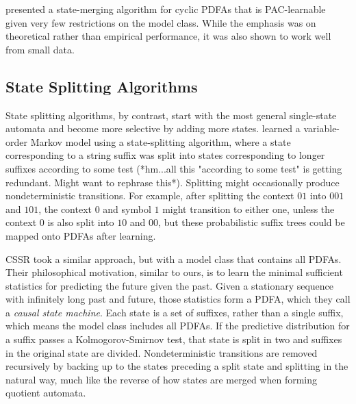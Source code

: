 \cite{Clark2004} presented a state-merging algorithm for cyclic PDFAs that is PAC-learnable given very few restrictions on the model class.  While the emphasis was on theoretical rather than empirical performance, it was also shown to work well from small data.

\subsection{State Splitting Algorithms}

State splitting algorithms, by contrast, start with the most general single-state automata and become more selective by adding more states.  \cite{Ron1996} learned a variable-order Markov model using a state-splitting algorithm, where a state corresponding to a string suffix was split into states corresponding to longer suffixes according to some test (*hm...all this "according to some test" is getting redundant.  Might want to rephrase this*).  Splitting might occasionally produce nondeterministic transitions.  For example, after splitting the context $01$ into $001$ and $101$, the context $0$ and symbol $1$ might transition to either one, unless the context $0$ is also split into $10$ and $00$, but these probabilistic suffix trees could be mapped onto PDFAs after learning.

CSSR \cite{Shalizi2004} took a similar approach, but with a model class that contains all PDFAs.  Their philosophical motivation, similar to ours, is to learn the minimal sufficient statistics for predicting the future given the past.  Given a stationary sequence with infinitely long past and future, those statistics form a PDFA, which they call a {\em causal state machine}.  Each state is a set of suffixes, rather than a single suffix, which means the model class includes all PDFAs.  If the predictive distribution for a suffix passes a Kolmogorov-Smirnov test, that state is split in two and suffixes in the original state are divided.  Nondeterministic transitions are removed recursively by backing up to the states preceding a split state and splitting in the natural way, much like the reverse of how states are merged when forming quotient automata.
